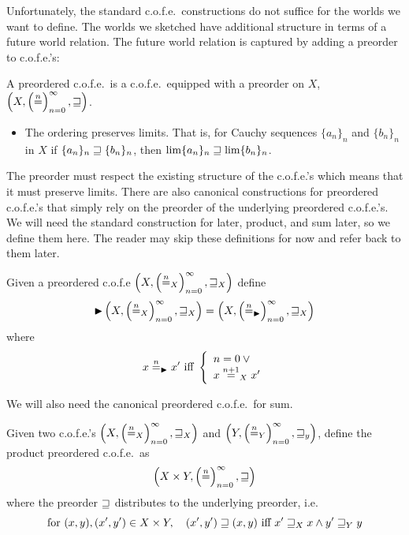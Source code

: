 \begin{jversion}
Unfortunately, the standard c.o.f.e.\ constructions do not suffice for the worlds we want to define.
The worlds we sketched have additional structure in terms of a future world relation.
The future world relation is captured by adding a preorder to c.o.f.e.'s:
\begin{definition}[Preordered c.o.f.e.]
  A preordered c.o.f.e.\ is a c.o.f.e.\ equipped with a preorder on $X$, $\left(X, \left(\nequal\right)_{n=0}^{\infty}, \future \right)$. 
  \begin{itemize}
  \item The ordering preserves limits. That is, for Cauchy sequences $\{a_n\}_n$ and $\{b_n\}_n$ in $X$ if $\{a_n\}_n \future\{b_n\}_n$, then $\lim \{a_n\}_n \future \lim \{b_n\}_n$.
  \end{itemize}
\end{definition}
The preorder must respect the existing structure of the c.o.f.e.'s which means that it must preserve limits.
There are also canonical constructions for preordered c.o.f.e.'s that simply rely on the preorder of the underlying preordered c.o.f.e.'s.
We will need the standard construction for later, product, and sum later, so we define them here.
The reader may skip these definitions for now and refer back to them later.
\begin{definition}
  \label{def:later-p-cofe}
  Given a preordered c.o.f.e $\left(X, \left(\nequal_X\right)_{n=0}^{\infty}, \future_X \right)$ define
  \[
    \blater\left(X, \left(\nequal_X\right)_{n=0}^{\infty}, \future_X \right) = \left(X, \left(\nequal[n]_{\blater}\right)_{n=0}^{\infty}, \future_X \right)
  \]
  where
  \[
    x \nequal_{\blater} x' \text{ iff } \left\{
      \begin{array}{l}
        n = 0 \vee{} \\
        x \nequal
        [n+1]_X x'
      \end{array}
    \right.
  \]
\end{definition}
We will also need the canonical preordered c.o.f.e.\ for sum.
\begin{definition}
  \label{def:product-p-cofe}
  Given two c.o.f.e.'s $\left(X,\left(\nequal[n]_X\right)_{n=0}^{\infty}, \future_X \right)$ and $\left(Y,\left(\nequal[n]_{Y}\right)_{n=0}^{\infty}, \future_y \right)$, define the product preordered c.o.f.e.\ as
  \[
  \left(X \times Y ,\left(\nequal[n]\right)_{n=0}^{\infty},\future \right)
  \]
  where the preorder $\future$ distributes to the underlying preorder, i.e.\
  \[
\text{for } (x,y),(x',y') \in X \times Y, \quad    (x',y') \future (x,y) \text{ iff } x' \future_X x \wedge y' \future_Y y
\]
\end{definition}
\end{jversion}
